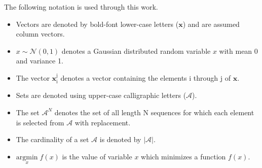 %
The following notation is used through this work. \par
\begin{itemize}
\item 
Vectors are denoted by bold-font lower-case letters ($\mathbf{x}$) and are assumed column vectors.
\item 
$x \sim \mathcal{N}(0,1)$ denotes a Gaussian distributed random variable $x$ with mean 0 and variance 1.
\item 
The vector $\mathbf{x}_{\mathrm{i}}^{\mathrm{j}}$ denotes a vector containing the elements i through j of $\mathbf{x}$.
\item Sets are denoted using upper-case calligraphic letters ($\mathcal{A}$).
\item The set $\mathcal{A}^N$ denotes the set of all length N sequences for which each element is selected from $\mathcal{A}$ with replacement.
\item The cardinality of a set $\mathcal{A}$ is denoted by $|\mathcal{A}|$.
\item $\underset{x}{\text{argmin}} \; f(x)$ is the value of variable $x$ which minimizes a function $f(x)$.
\end{itemize}

\clearpage
